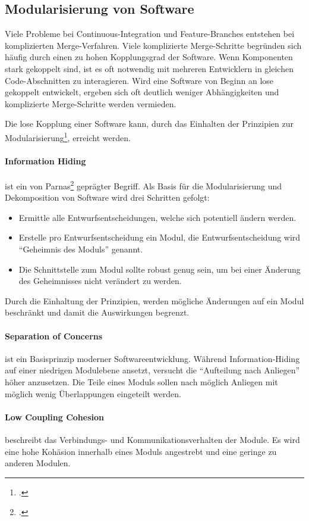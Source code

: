 \subsection{Modularisierung von Software}

Viele Probleme bei Continuous-Integration und Feature-Branches entstehen bei komplizierten Merge-Verfahren. Viele komplizierte Merge-Schritte begründen sich häufig durch einen zu hohen Kopplungsgrad der Software. Wenn Komponenten stark gekoppelt sind, ist es oft notwendig mit mehreren Entwicklern in gleichen Code-Abschnitten zu interagieren. Wird eine Software von Beginn an lose gekoppelt entwickelt, ergeben sich oft deutlich weniger Abhängigkeiten und komplizierte Merge-Schritte werden vermieden.

Die lose Kopplung einer Software kann, durch das Einhalten der Prinzipien zur Modularisierung\footcite{2012-barth-modularisation}, erreicht werden. 

\paragraph{Information Hiding} ist ein von Parnas\footcite{1972-parnas} geprägter Begriff. Als Basis für die Modularisierung und Dekomposition von Software wird drei Schritten gefolgt:
\begin{itemize}
\item Ermittle alle Entwurfsentscheidungen, welche sich potentiell ändern werden.
\item Erstelle pro Entwurfsentscheidung ein Modul, die Entwurfsentscheidung wird ``Geheimnis des Moduls'' genannt.
\item Die Schnittstelle zum Modul sollte robust genug sein, um bei einer Änderung des Geheimnisses nicht verändert zu werden.
\end{itemize}
Durch die Einhaltung der Prinzipien, werden mögliche Änderungen auf ein Modul beschränkt und damit die Auswirkungen begrenzt.
\paragraph{Separation of Concerns} ist ein Basisprinzip moderner Softwareentwicklung. Während Information-Hiding auf einer niedrigen Modulebene ansetzt, versucht die ``Aufteilung nach Anliegen'' höher anzusetzen. Die Teile eines Moduls sollen nach möglich Anliegen  mit möglich wenig Überlappungen eingeteilt werden. 
\paragraph{Low Coupling Cohesion} beschreibt das Verbindungs- und Kommunikationsverhalten der Module. Es wird eine hohe Kohäsion innerhalb eines Moduls angestrebt und eine geringe zu anderen Modulen.

